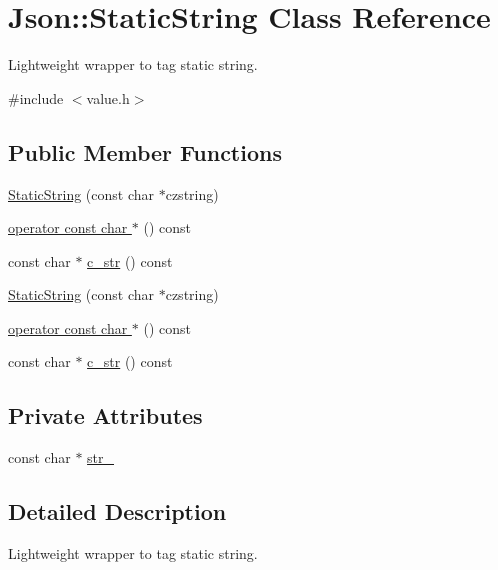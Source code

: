 \hypertarget{classJson_1_1StaticString}{\section{Json\-:\-:Static\-String Class Reference}
\label{de/de1/classJson_1_1StaticString}
}


Lightweight wrapper to tag static string.  




{\ttfamily \#include $<$value.\-h$>$}

\subsection*{Public Member Functions}
\begin{DoxyCompactItemize}
\item 
\hyperlink{classJson_1_1StaticString_afb6baf1ec078ce76f0b0f9b39d19437f}{Static\-String} (const char $\ast$czstring)
\item 
\hyperlink{classJson_1_1StaticString_ac2b334d46bbea4c0227e508fc66433e9}{operator const char $\ast$} () const 
\item 
const char $\ast$ \hyperlink{classJson_1_1StaticString_ab86fc6a3183adf12fdba4b370acf1754}{c\-\_\-str} () const 
\item 
\hyperlink{classJson_1_1StaticString_afb6baf1ec078ce76f0b0f9b39d19437f}{Static\-String} (const char $\ast$czstring)
\item 
\hyperlink{classJson_1_1StaticString_ac2b334d46bbea4c0227e508fc66433e9}{operator const char $\ast$} () const 
\item 
const char $\ast$ \hyperlink{classJson_1_1StaticString_ab86fc6a3183adf12fdba4b370acf1754}{c\-\_\-str} () const 
\end{DoxyCompactItemize}
\subsection*{Private Attributes}
\begin{DoxyCompactItemize}
\item 
const char $\ast$ \hyperlink{classJson_1_1StaticString_a70ae5d020dde2080a97e23d816e0bab0}{str\-\_\-}
\end{DoxyCompactItemize}


\subsection{Detailed Description}
Lightweight wrapper to tag static string. 

